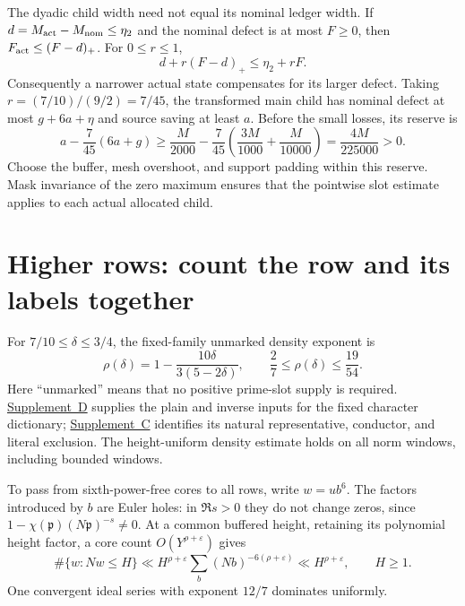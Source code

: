 \documentclass[11pt]{article}
\newcommand{\eps}{\varepsilon}
\newcommand{\supp}[1]{\href{supplement.pdf}{Supplement~#1}}
\begin{document}
The dyadic child width need not equal its nominal ledger width. If
$d=M_{\rm act}-M_{\rm nom}\le\eta_2$ and the nominal defect is at
most $F\ge0$, then $F_{\rm act}\le(F-d)_+$. For $0\le r\le1$,
\begin{equation}\label{eq:width}
 d+r(F-d)_+\le\eta_2+rF.
\end{equation}
Consequently a narrower actual state compensates for its larger defect.
Taking $r=(7/10)/(9/2)=7/45$, the transformed main child has nominal
defect at most $g+6a+\eta$ and source saving at least $a$. Before the
small losses, its reserve is
\begin{equation}\label{eq:low}
 a-\frac7{45}(6a+g)
 \ge\frac M{2000}-\frac7{45}
       \left(\frac{3M}{1000}+\frac M{10000}\right)
 =\frac{4M}{225000}>0.
\end{equation}
Choose the buffer, mesh overshoot, and support padding within this
reserve. Mask invariance of the zero maximum ensures that the
pointwise slot estimate applies to each actual allocated child.

\section{Higher rows: count the row and its labels together}\label{sec:high}

For $7/10\le\delta\le3/4$, the fixed-family unmarked density exponent is
\begin{equation}\label{eq:rho}
 \rho(\delta)=1-\frac{10\delta}{3(5-2\delta)},
 \qquad \frac27\le\rho(\delta)\le\frac{19}{54}.
\end{equation}
Here ``unmarked'' means that no positive prime-slot supply is required.
\supp{D} supplies the plain and inverse inputs for the fixed character
dictionary; \supp{C} identifies its natural representative, conductor,
and literal exclusion. The height-uniform density estimate holds on
all norm windows, including bounded windows.

To pass from sixth-power-free cores to all rows, write $w=ub^6$.
The factors introduced by $b$ are Euler holes: in $\Re s>0$ they do not
change zeros, since $1-\chi(\mathfrak p)(N\mathfrak p)^{-s}\ne0$.
At a common buffered height, retaining its polynomial height factor,
a core count $O(Y^{\rho+\eps})$ gives
\[
 \#\{w:Nw\le H\}
 \ll H^{\rho+\eps}\sum_b(Nb)^{-6(\rho+\eps)}
 \ll H^{\rho+\eps},\qquad H\ge1.
\]
One convergent ideal series with exponent $12/7$ dominates uniformly.
\end{document}

